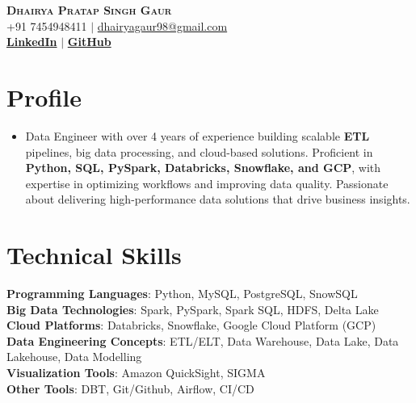 \documentclass[letterpaper,11pt]{article}
\begin{document}
\begin{center}
    \textbf{\Huge \scshape Dhairya Pratap Singh Gaur} \\ \vspace{1pt}
    \small +91 7454948411 $|$ \href{mailto:dhairyagaur98@gmail.com}{{dhairyagaur98@gmail.com}}    \\ 
    \small  
    \href{https://www.linkedin.com/in/asmogaur/}{\bf LinkedIn} $|$
    \href{https://github.com/Asmogaur}{\bf GitHub} 
    
\end{center}

\section{Profile}
\begin{itemize}[leftmargin=0.15in, label={}]
\item 
Data Engineer with over 4 years of experience building scalable \textbf{ETL} pipelines, big data processing, and cloud-based solutions. Proficient in \textbf{Python, SQL, PySpark, Databricks, Snowflake, and GCP}, with expertise in optimizing workflows and improving data quality. Passionate about delivering high-performance data solutions that drive business insights.
\end{itemize}

\section{Technical Skills}
 \begin{itemize}[leftmargin=0.15in, label={}]
    \small{\item{
     \textbf{Programming Languages}{:\hspace{0.76cm} Python, MySQL, PostgreSQL, SnowSQL} \\
     \textbf{Big Data Technologies}{:\hspace{1.19cm} Spark, PySpark, Spark SQL, HDFS, Delta Lake} \\
     \textbf{Cloud Platforms}{:\hspace{2.21cm} Databricks, Snowflake, Google Cloud Platform (GCP)} \\
     \textbf{Data Engineering Concepts}{:\hspace{0.28cm} ETL/ELT, Data Warehouse, Data Lake, Data Lakehouse, Data Modelling} \\
     \textbf{Visualization Tools}{:\hspace{1.77cm} Amazon QuickSight, SIGMA} \\
     \textbf{Other Tools}{:\hspace{3.04cm} DBT, Git/Github, Airflow, CI/CD} \\
    }}
 \end{itemize}
\end{document}
